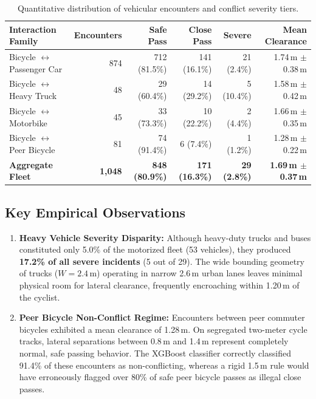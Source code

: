 \begin{table}[h!]
	\centering
	\caption{Quantitative distribution of vehicular encounters and conflict severity tiers.}
	\label{tab:conflict_breakdown}
	\setlength{\tabcolsep}{5pt}
	\renewcommand{\arraystretch}{1.2}
	\begin{tabularx}{\textwidth}{|>{\raggedright\arraybackslash}X|r|r|r|r|r|}
		\hline
		\textbf{Interaction Family} & \textbf{Encounters} & \textbf{Safe Pass} & \textbf{Close Pass} & \textbf{Severe} & \textbf{Mean Clearance} \\
		\hline
		\hline
		Bicycle $\leftrightarrow$ Passenger Car & 874 & 712 (81.5\%) & 141 (16.1\%) & 21 (2.4\%) & 1.74\,m $\pm$ 0.38\,m \\
		Bicycle $\leftrightarrow$ Heavy Truck & 48 & 29 (60.4\%) & 14 (29.2\%) & 5 (10.4\%) & 1.58\,m $\pm$ 0.42\,m \\
		Bicycle $\leftrightarrow$ Motorbike & 45 & 33 (73.3\%) & 10 (22.2\%) & 2 (4.4\%) & 1.66\,m $\pm$ 0.35\,m \\
		Bicycle $\leftrightarrow$ Peer Bicycle & 81 & 74 (91.4\%) & 6 (7.4\%) & 1 (1.2\%) & 1.28\,m $\pm$ 0.22\,m \\
		\hline
		\textbf{Aggregate Fleet} & \textbf{1,048} & \textbf{848 (80.9\%)} & \textbf{171 (16.3\%)} & \textbf{29 (2.8\%)} & \textbf{1.69\,m $\pm$ 0.37\,m} \\
		\hline
	\end{tabularx}
\end{table}

\subsection{Key Empirical Observations}
\begin{enumerate}
    \item \textbf{Heavy Vehicle Severity Disparity:} Although heavy-duty trucks and buses constituted only 5.0\% of the motorized fleet (53 vehicles), they produced \textbf{17.2\% of all severe incidents} (5 out of 29). The wide bounding geometry of trucks ($W = 2.4\,\text{m}$) operating in narrow 2.6\,m urban lanes leaves minimal physical room for lateral clearance, frequently encroaching within 1.20\,m of the cyclist.
    \item \textbf{Peer Bicycle Non-Conflict Regime:} Encounters between peer commuter bicycles exhibited a mean clearance of 1.28\,m. On segregated two-meter cycle tracks, lateral separations between 0.8\,m and 1.4\,m represent completely normal, safe passing behavior. The XGBoost classifier correctly classified 91.4\% of these encounters as non-conflicting, whereas a rigid 1.5\,m rule would have erroneously flagged over 80\% of safe peer bicycle passes as illegal close passes.
\end{enumerate}

